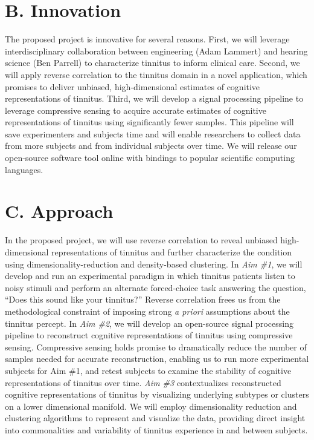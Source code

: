 \documentclass[11pt, notitlepage]{article} %
\begin{document}

\section*{B. Innovation}

The proposed project is innovative for several reasons.
First, we will leverage interdisciplinary collaboration between engineering (Adam Lammert)
and hearing science (Ben Parrell) to characterize tinnitus to inform clinical care.
Second, we will apply reverse correlation to the tinnitus domain in a novel application,
which promises to deliver unbiased, high-dimensional estimates of cognitive representations of tinnitus.
Third, we will develop a signal processing pipeline to leverage compressive sensing
to acquire accurate estimates of cognitive representations of tinnitus using significantly fewer samples.
This pipeline will save experimenters and subjects time and will enable researchers
to collect data from more subjects and from individual subjects over time.
We will release our open-source software tool online with bindings to popular scientific computing languages.


\section*{C. Approach}

In the proposed project, we will use reverse correlation to reveal unbiased high-dimensional
representations of tinnitus and further characterize the condition
using dimensionality-reduction and density-based clustering.
In \emph{Aim \#1}, we will develop and run an experimental paradigm
in which tinnitus patients listen to noisy stimuli and perform an alternate forced-choice task
answering the question, ``Does this sound like your tinnitus?''
Reverse correlation frees us from the methodological constraint of imposing strong \emph{a priori}
assumptions about the tinnitus percept.
In \emph{Aim \#2}, we will develop an open-source signal processing pipeline
to reconstruct cognitive representations of tinnitus using compressive sensing.
Compressive sensing holds promise to dramatically reduce the number of samples
needed for accurate reconstruction, enabling us to run more experimental subjects for Aim \#1,
and retest subjects to examine the stability of cognitive representations of tinnitus over time.
\emph{Aim \#3} contextualizes reconstructed cognitive representations of tinnitus
by visualizing underlying subtypes or clusters on a lower dimensional manifold.
We will employ dimensionality reduction and clustering algorithms to represent and visualize the data,
providing direct insight into commonalities and variability of tinnitus experience in and between subjects.
\end{document}
